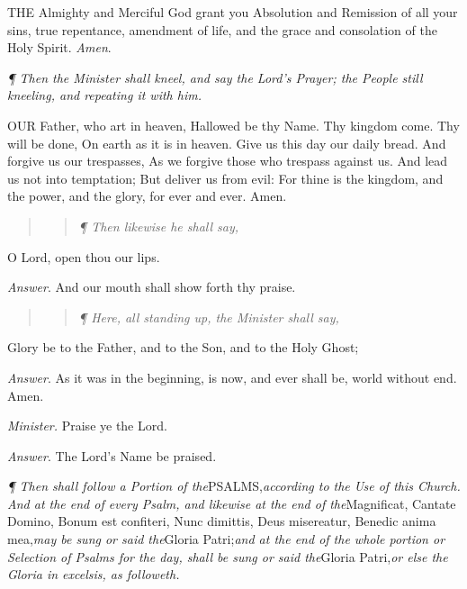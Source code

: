 THE
Almighty and Merciful God grant you Absolution and Remission of all your
sins, true repentance, amendment of life, and the grace and consolation
of the Holy Spirit. \emph{Amen}. 

\emph{¶
Then the Minister shall kneel, and say the Lord’s Prayer; the People
still kneeling, and repeating it with him.}

OUR
Father, who art in heaven, Hallowed be thy Name. Thy kingdom come. Thy
will be done, On earth as it is in heaven. Give us this day our daily
bread. And forgive us our trespasses, As we forgive those who trespass
against us. And lead us not into temptation; But deliver us from evil:
For thine is the kingdom, and the power, and the glory, for ever and ever.
Amen.

\begin{quote}

\begin{quote}

\emph{¶ Then likewise he shall say,}

\end{quote}

\end{quote}

O Lord,
open thou our lips.\emph{}

\emph{Answer}. And our mouth shall
show forth thy praise.

\begin{quote}

\begin{quote}

\emph{¶ Here, all standing up, the Minister shall say,}

\end{quote}

\end{quote}

Glory
be to the Father, and to the Son, and to the Holy Ghost;

\emph{Answer}. As it was in the beginning, is now,
and ever shall be, world without end. Amen.

\emph{Minister.} Praise ye the Lord.

\emph{Answer}. The Lord’s Name be praised.

\emph{¶
Then shall follow a Portion of the}PSALMS,\emph{according to the Use of this Church. And at the end of every Psalm,
and likewise at the end of the}Magnificat, Cantate Domino, Bonum
est confiteri, Nunc dimittis, Deus misereatur, Benedic anima mea,\emph{may be sung or said the}Gloria Patri;\emph{and at the end of the
whole portion or Selection of Psalms for the day, shall be sung or said
the}Gloria Patri,\emph{or else the Gloria in excelsis, as followeth.}

